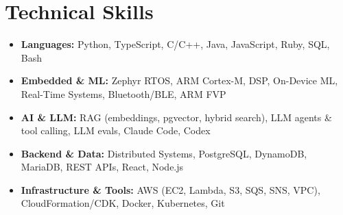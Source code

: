 \documentclass[letterpaper,11pt]{article}
\newcommand{\resumeSubHeadingListStart}{\begin{itemize}[leftmargin=*, label={}]}
\newcommand{\resumeSubHeadingListEnd}{\end{itemize}}
\begin{document}
\section{Technical Skills}
  \resumeSubHeadingListStart
    \item \small{\textbf{Languages:} Python, TypeScript, C/C++, Java, JavaScript, Ruby, SQL, Bash} \vspace{-4pt}
    \item \small{\textbf{Embedded \& ML:} Zephyr RTOS, ARM Cortex-M, DSP, On-Device ML, Real-Time Systems, Bluetooth/BLE, ARM FVP} \vspace{-4pt}
    \item \small{\textbf{AI \& LLM:} RAG (embeddings, pgvector, hybrid search), LLM agents \& tool calling, LLM evals, Claude Code, Codex} \vspace{-4pt}
    \item \small{\textbf{Backend \& Data:} Distributed Systems, PostgreSQL, DynamoDB, MariaDB, REST APIs, React, Node.js} \vspace{-4pt}
    \item \small{\textbf{Infrastructure \& Tools:} AWS (EC2, Lambda, S3, SQS, SNS, VPC), CloudFormation/CDK, Docker, Kubernetes, Git}
  \resumeSubHeadingListEnd
\end{document}
